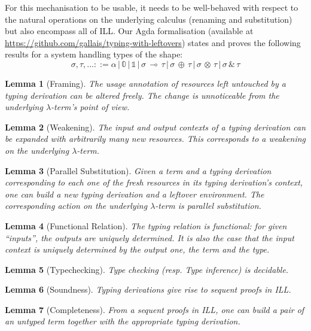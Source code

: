 \documentclass[a4paper]{easychair}
\newtheorem{lemma}{Lemma}
\begin{document}
For this mechanisation to be usable, it needs to be well-behaved with
respect to the natural operations on the underlying calculus (renaming
and substitution) but also encompass all of ILL. Our Agda formalisation
(available at \url{https://github.com/gallais/typing-with-leftovers})
states and proves the following results for a system handling types of
the shape:
\[σ, τ, ... ::= α \,|\, 𝟘 \,|\, 𝟙 \,|\, σ \,⊸\, τ \,|\, σ \,⊕\, τ \,|\, σ \,⊗\, τ \,|\, σ \,\&\, τ\]

\begin{lemma}[Framing] The usage annotation of resources left untouched
by a typing derivation can be altered freely. The change is unnoticeable
from the underlying $λ$-term's point of view.
\end{lemma}

\begin{lemma}[Weakening] The input and output contexts of a typing
derivation can be expanded with arbitrarily many new resources. This
corresponds to a weakening on the underlying $λ$-term.
\end{lemma}

\begin{lemma}[Parallel Substitution] Given a term and a typing derivation
corresponding to each one of the fresh resources in its typing derivation's
context, one can build a new typing derivation and a leftover environment.
The corresponding action on the underlying $λ$-term is parallel substitution.
\end{lemma}

\begin{lemma}[Functional Relation] The typing relation is functional: for
given ``inputs'', the outputs are uniquely determined. It is also the case
that the input context is uniquely determined by the output one, the term
and the type.
\end{lemma}

\begin{lemma}[Typechecking] Type checking (resp. Type inference) is decidable.
\end{lemma}

\begin{lemma}[Soundness] Typing derivations give rise to sequent proofs
in ILL.
\end{lemma}

\begin{lemma}[Completeness] From a sequent proofs in ILL, one can build a
pair of an untyped term together with the appropriate typing derivation.
\end{lemma}



\end{document}
